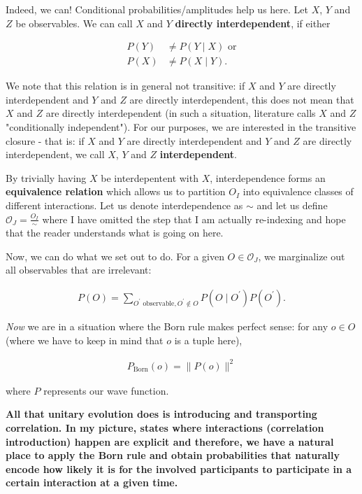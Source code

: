 \documentclass{article}
\begin{document}
Indeed, we can! Conditional probabilities/amplitudes help us here. Let $X$, $Y$ and $Z$ be observables. We can call $X$ and $Y$ \textbf{directly interdependent}, if either

\begin{align*}
P(Y) &\neq P(Y\mid X) \text{ or} \\
P(X) &\neq P(X\mid Y).
\end{align*}

We note that this relation is in general not transitive: if $X$ and $Y$ are directly interdependent and $Y$ and $Z$ are directly interdependent, this does not mean that $X$ and $Z$ are directly interdependent (in such a situation, literature calls $X$ and $Z$ "conditionally independent"). For our purposes, we are interested in the transitive closure - that is: if $X$ and $Y$ are directly interdependent and $Y$ and $Z$ are directly interdependent, we call $X$, $Y$ and $Z$ \textbf{interdependent}.

By trivially having $X$ be interdepentent with $X$, interdependence forms an \textbf{equivalence relation} which allows us to partition $O_I$ into equivalence classes of different interactions. Let us denote interdependence as $\sim$ and let us define $\mathcal{O}_J = \frac{O_I}{\sim}$ where I have omitted the step that I am actually re-indexing and hope that the reader understands what is going on here.

Now, we can do what we set out to do. For a given $O\in\mathcal{O}_J$, we marginalize out all observables that are irrelevant:

\begin{align*}
P(O) = \sum_{O^\prime \text{ observable}, O^\prime \notin O} P(O\mid O^\prime) P(O^\prime).
\end{align*}

\textit{Now} we are in a situation where the Born rule makes perfect sense: for any $o\in O$ (where we have to keep in mind that $o$ is a tuple here),

\begin{align*}
P_{\text{Born}}(o) = \|P(o)\|^2
\end{align*}

where $P$ represents our wave function.

\textbf{All that unitary evolution does is introducing and transporting correlation. In my picture, states where interactions (correlation introduction) happen are explicit and therefore, we have a natural place to apply the Born rule and obtain probabilities that naturally encode how likely it is for the involved participants to participate in a certain interaction at a given time.}
\end{document}
